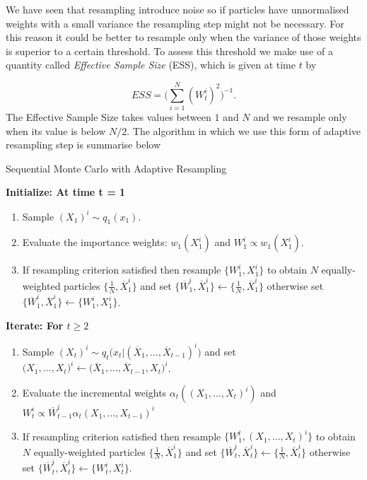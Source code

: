 We have seen that resampling introduce noise so if particles have unnormalised weights with a small variance the resampling step might not be necessary. For this reason it could be better to resample only when the variance of those weights is superior to a certain threshold. To assess this threshold we make use of a quantity called \textit{Effective Sample Size} (ESS), which is given at time $t$ by

\begin{equation*}
    ESS = \Bigg( \sum_{i=1}^N (W_t^i)^2\Bigg)^{-1}.
\end{equation*}
The Effective Sample Size takes values between $1$ and $N$ and we resample only when its value is below $N/2$. The algorithm in which we use this form of adaptive resampling step is summarise below 

\begin{algorithm}[H]
\caption{Sequential Monte Carlo with Adaptive Resampling}\label{Adaptive}
    \begin{algorithmic}
        \State  \bf{Initialize:} \normalfont At time t = 1
            \begin{enumerate}
	            \item Sample $(X_{1})^i \sim q_1(x_1)$.
	            \item Evaluate the importance weights: $w_1(X_1^i)$ and $W^i_1 \propto w_1(X_1^i)$.
	            \item If resampling criterion satisfied then resample $\{ W_1^i, X_1^i \}$ to obtain $N$ equally-weighted particles $\big\{ \frac{1}{N}, \overline{X}_1^i \big\}$ and set $\big\{ \overline{W}_1^i, \overline{X}_1^i \big\} \leftarrow \big\{ \frac{1}{N}, \overline{X}_1^i \big\}$ otherwise set $\big\{ \overline{W}_1^i, \overline{X}_1^i \big\} \leftarrow \big\{ W^i_1, X_1^i \big\}$.
            \end{enumerate}
        \State  \bf{Iterate:} \normalfont For $t \geq 2$
            \begin{enumerate}
	            \item Sample $(X_{t})^i \sim q_t \big(x_t | (\overline{X}_1, \dots, \overline{X}_{t-1})^i \big)$ and set $\big(X_{1}, \dots, X_{t} \big)^i \leftarrow \big(\overline{X}_1, \dots, \overline{X}_{t-1}, X_t \big)^i$.
	            \item Evaluate the incremental weights $\alpha_t((X_1, \dots, X_t)^i)$ and $W^i_t \propto \overline{W}^i_{t-1} \alpha_t(X_1, \dots, X_{t-1})^i$
	            \item If resampling criterion satisfied then resample $\{ W_1^t, (X_1, \dots, X_t)^i \}$ to obtain $N$ equally-weighted particles $\big\{ \frac{1}{N}, \overline{X}_1^i \big\}$ and set $\big\{ \overline{W}_t^i, \overline{X}_t^i \big\} \leftarrow \big\{ \frac{1}{N}, \overline{X}_t^i \big\}$ otherwise set $\big\{ \overline{W}_t^i, \overline{X}_t^i \big\} \leftarrow \big\{ W^i_t, X_t^i \big\}$.
	        \end{enumerate}
    \end{algorithmic}
\end{algorithm}





